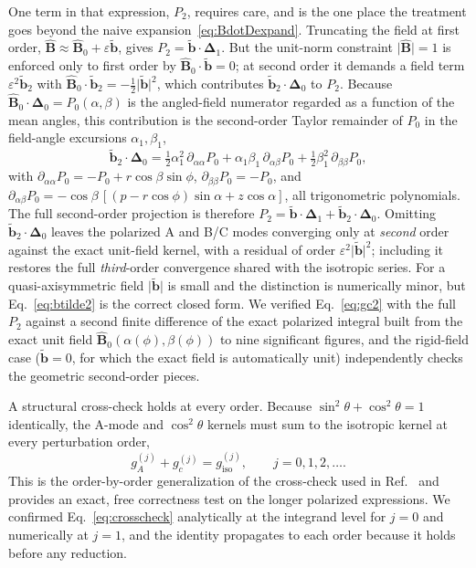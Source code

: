 \documentclass[11pt]{article}
\newcommand{\Del}{\bm{\Delta}}
\newcommand{\Bhat}{\hat{\bm{B}}}
\newcommand{\bperp}{\tilde{\bm{b}}}
\newcommand{\eps}{\varepsilon}
\begin{document}
One term in that expression, $P_2$, requires care, and is the one place the treatment goes beyond the naive expansion~\eqref{eq:BdotDexpand}. Truncating the field at first order, $\Bhat\approx\Bhat_0+\eps\bperp$, gives $P_2=\bperp\cdot\Del_1$. But the unit-norm constraint $\lvert\Bhat\rvert=1$ is enforced only to first order by $\Bhat_0\cdot\bperp=0$; at second order it demands a field term $\eps^2\bperp_2$ with $\Bhat_0\cdot\bperp_2=-\tfrac12\lvert\bperp\rvert^2$, which contributes $\bperp_2\cdot\Del_0$ to $P_2$. Because $\Bhat_0\cdot\Del_0=P_0(\alpha,\beta)$ is the angled-field numerator regarded as a function of the mean angles, this contribution is the second-order Taylor remainder of $P_0$ in the field-angle excursions $\alpha_1,\beta_1$,
\begin{equation}
\bperp_2\cdot\Del_0=\tfrac12\alpha_1^2\,\partial_{\alpha\alpha}P_0+\alpha_1\beta_1\,\partial_{\alpha\beta}P_0+\tfrac12\beta_1^2\,\partial_{\beta\beta}P_0,
\label{eq:btilde2}
\end{equation}
with $\partial_{\alpha\alpha}P_0=-P_0+r\cos\beta\sin\phi$, $\partial_{\beta\beta}P_0=-P_0$, and $\partial_{\alpha\beta}P_0=-\cos\beta\,[(p-r\cos\phi)\sin\alpha+z\cos\alpha]$, all trigonometric polynomials. The full second-order projection is therefore $P_2=\bperp\cdot\Del_1+\bperp_2\cdot\Del_0$. Omitting $\bperp_2\cdot\Del_0$ leaves the polarized A and B/C modes converging only at \emph{second} order against the exact unit-field kernel, with a residual of order $\eps^2\lvert\bperp\rvert^2$; including it restores the full \emph{third}-order convergence shared with the isotropic series. For a quasi-axisymmetric field $\lvert\bperp\rvert$ is small and the distinction is numerically minor, but Eq.~\eqref{eq:btilde2} is the correct closed form. We verified Eq.~\eqref{eq:gc2} with the full $P_2$ against a second finite difference of the exact polarized integral built from the exact unit field $\Bhat_0(\alpha(\phi),\beta(\phi))$ to nine significant figures, and the rigid-field case ($\bperp=0$, for which the exact field is automatically unit) independently checks the geometric second-order pieces.

A structural cross-check holds at every order. Because $\sin^2\theta+\cos^2\theta=1$ identically, the A-mode and $\cos^2\theta$ kernels must sum to the isotropic kernel at every perturbation order,
\begin{equation}
g_A^{(j)}+g_c^{(j)}=g_{\mathrm{iso}}^{(j)},\qquad j=0,1,2,\dots .
\label{eq:crosscheck}
\end{equation}
This is the order-by-order generalization of the cross-check used in Ref.~\cite{schwartz2025} and provides an exact, free correctness test on the longer polarized expressions. We confirmed Eq.~\eqref{eq:crosscheck} analytically at the integrand level for $j=0$ and numerically at $j=1$, and the identity propagates to each order because it holds before any reduction.
\end{document}

